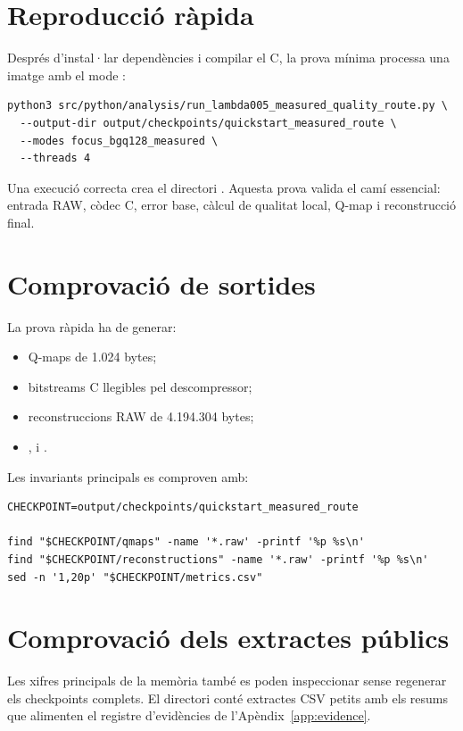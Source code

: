 \section{Reproducció ràpida}

Després d'instal·lar dependències i compilar el C, la prova mínima processa una
imatge amb el mode :

\begin{verbatim}
python3 src/python/analysis/run_lambda005_measured_quality_route.py \
  --output-dir output/checkpoints/quickstart_measured_route \
  --modes focus_bgq128_measured \
  --threads 4
\end{verbatim}

Una execució correcta crea el directori
. Aquesta prova valida el
camí essencial: entrada RAW, còdec C, error base, càlcul de qualitat local,
Q-map i reconstrucció final.

\section{Comprovació de sortides}

La prova ràpida ha de generar:

\begin{itemize}[leftmargin=*]
  \item Q-maps de 1.024 bytes;
  \item bitstreams C llegibles pel descompressor;
  \item reconstruccions RAW de 4.194.304 bytes;
  \item \code{metrics.csv},  i .
\end{itemize}

Les invariants principals es comproven amb:

\begin{verbatim}
CHECKPOINT=output/checkpoints/quickstart_measured_route

find "$CHECKPOINT/qmaps" -name '*.raw' -printf '%p %s\n'
find "$CHECKPOINT/reconstructions" -name '*.raw' -printf '%p %s\n'
sed -n '1,20p' "$CHECKPOINT/metrics.csv"
\end{verbatim}

\section{Comprovació dels extractes públics}

Les xifres principals de la memòria també es poden inspeccionar sense regenerar
els checkpoints complets. El directori 
conté extractes CSV petits amb els resums que alimenten el registre
d'evidències de l'Apèndix~\ref{app:evidence}.

